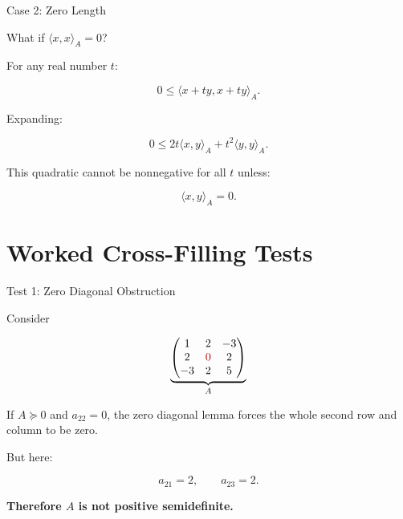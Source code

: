 \documentclass[10pt]{beamer}
\theoremstyle{definition}
\newcommand{\x}[1]{\alert{\textbf{#1}}}
\newcommand{\rd}[1]{{\color{red!70!black}#1}}
\begin{document}
\begin{frame}{Case 2: Zero Length}

What if $\langle x,x\rangle_A=0$?

\vspace{0.25cm}

For any real number $t$:

$$
0\le \langle x+ty,x+ty\rangle_A.
$$

\vspace{0.2cm}

Expanding:

$$
0\le
2t\langle x,y\rangle_A+t^2\langle y,y\rangle_A.
$$

This quadratic cannot be nonnegative for all $t$ unless:

$$
\boxed{\langle x,y\rangle_A=0.}
$$

\end{frame}


\section{Worked Cross-Filling Tests}

\begin{frame}{Test 1: Zero Diagonal Obstruction}

Consider

\[
\underbrace{
\begin{pmatrix}
1&2&-3\\
2&\rd{0}&2\\
-3&2&5
\end{pmatrix}}_{A}
\]

\vfill

If $A\succeq0$ and $a_{22}=0$, the zero diagonal lemma forces the whole second row and column to be zero.

\vfill

But here:

$$
a_{21}=2,\qquad a_{23}=2.
$$

\vfill

\begin{center}
\x{Therefore $A$ is not positive semidefinite.}
\end{center}

\end{frame}
\end{document}
